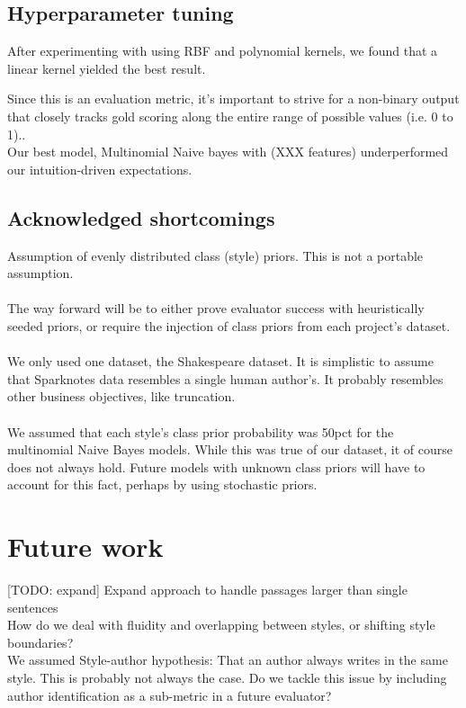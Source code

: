 \documentclass[letterpaper, 10 pt, conference]{ieeeconf}  %
\begin{document}
  \subsection{Hyperparameter tuning}
    After experimenting with using RBF and polynomial kernels, we found that a linear kernel yielded the best result.


    Since this is an evaluation metric, it's important to strive for a non-binary output that closely tracks gold scoring along the entire range of possible values (i.e. 0 to 1)..\\
    Our best model, Multinomial Naive bayes with (XXX features) underperformed our intuition-driven expectations.


  \subsection{Acknowledged shortcomings}
  Assumption of evenly distributed class (style) priors. This is not a portable assumption. \\ \\The way forward will be to either prove evaluator success with heuristically seeded priors, or require the injection of class priors from each project's dataset. \\ \\
We only used one dataset, the Shakespeare dataset. It is simplistic to assume that Sparknotes data resembles a single human author's. It probably resembles other business objectives, like truncation.
\\
\\
  We assumed that each style's class prior probability was 50pct for the multinomial Naive Bayes models. While this was true of our dataset, it of course does not always hold. Future models with unknown class priors will have to account for this fact, perhaps by using stochastic priors.
\section{Future work}
[TODO: expand]
Expand approach to handle passages larger than single sentences\\

How do we deal with fluidity and overlapping between styles, or shifting style boundaries?\\

We assumed Style-author hypothesis: That an author always writes in the same style. This is probably not always the case. Do we tackle this issue by including author identification as a sub-metric in a future evaluator?
\end{document}
